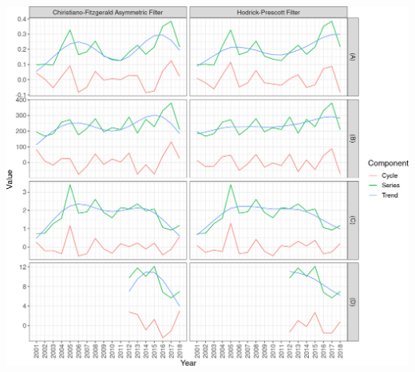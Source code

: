 \documentclass[10pt,landscape,a3paper]{article}
\begin{document}
\begin{center}\includegraphics{img/modelling/aa-eda-ts-22} \end{center}
\end{document}
